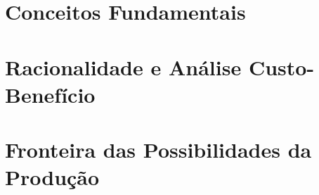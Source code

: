 \documentclass[table]{beamer}
\begin{document}
\section{Conceitos Fundamentais}

\section{Racionalidade e An\'alise Custo-Benef\'icio}

\section{Fronteira das Possibilidades da Produ\c c\~ao}

% 
\end{document}
